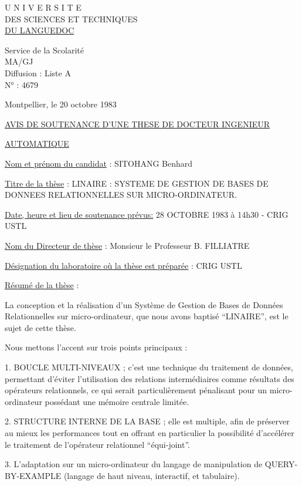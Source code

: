 
\begin{center}
U N I V E R S I T E\\
DES SCIENCES ET TECHNIQUES\\
\uline{DU LANGUEDOC}

Service de la Scolarité\\
MA/GJ\\
Diffusion : Liste A\\
N° : 4679
\end{center}

Montpellier, le 20 octobre 1983

\begin{center}
\uline{AVIS DE SOUTENANCE D'UNE THESE DE DOCTEUR INGENIEUR}

\uline{AUTOMATIQUE}
\end{center}

\uline{Nom et prénom du candidat} : SITOHANG Benhard

\uline{Titre de la thèse} : LINAIRE : SYSTEME DE GESTION DE BASES DE DONNEES RELATIONNELLES SUR MICRO-ORDINATEUR.

\uline{Date, heure et lieu de soutenance prévus:} 28 OCTOBRE 1983 à 14h30 - CRIG USTL

\uline{Nom du Directeur de thèse} : Monsieur le Professeur B. FILLIATRE

\uline{Désignation du laboratoire où la thèse est préparée} : CRIG USTL

\uline{Résumé de la thèse} :

La conception et la réalisation d'un Système de Gestion de Bases de Données Relationnelles sur micro-ordinateur, que nous avons baptisé ``LINAIRE'', est le sujet de cette thèse.

Nous mettons l'accent sur trois points principaux :

1. BOUCLE MULTI-NIVEAUX ; c'est une technique du traitement de données, permettant d'éviter l'utilisation des relations intermédiaires comme résultats des opérateurs relationnels, ce qui serait particulièrement pénalisant pour un micro-ordinateur possédant une mémoire centrale limitée.

2. STRUCTURE INTERNE DE LA BASE ; elle est multiple, afin de préserver au mieux les performances tout en offrant en particulier la possibilité d'accélérer le traitement de l'opérateur relationnel ``équi-joint''.

3. L'adaptation sur un micro-ordinateur du langage de manipulation de QUERY-BY-EXAMPLE (langage de haut niveau, interactif, et tabulaire).

